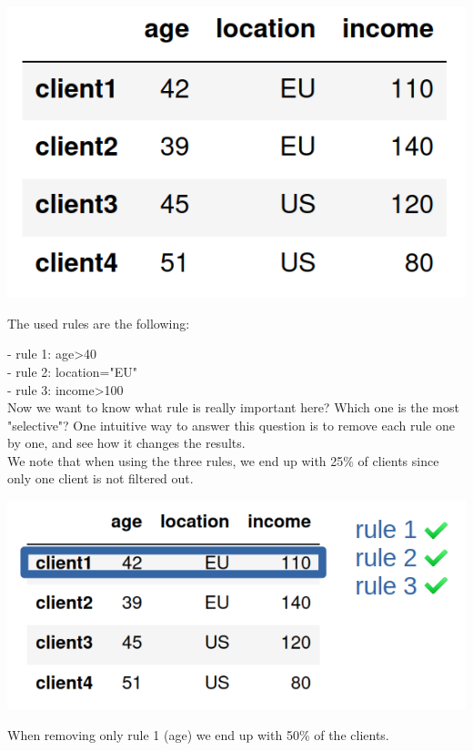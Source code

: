 \begin{center}
\includegraphics[scale=0.3]{./../img/data-simple-example.png}
\end{center}

The used rules are the following:

- rule 1: age>40 \\
- rule 2: location="EU" \\
- rule 3: income>100 \\

Now we want to know what rule is really important here? Which one is the most "selective"? One intuitive way to answer this question is to remove each rule one by one, and see how it changes the results. \\

We note that when using the three rules, we end up with 25\% of clients since only one client is not filtered out. 

\begin{center}
\includegraphics[scale=0.3]{./../img/3rules.png}
\end{center}


When removing only rule 1 (age) we end up with 50\% of the clients. 

